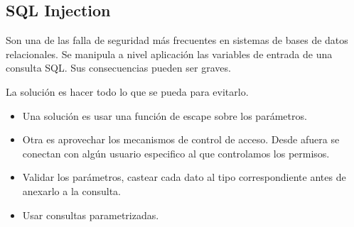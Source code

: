 \subsection*{SQL Injection}
Son una de las falla de seguridad más frecuentes en sistemas de bases de datos relacionales. Se manipula a nivel aplicación las variables de entrada de una consulta SQL. Sus consecuencias pueden ser graves.


\medskip
La solución es hacer todo lo que se pueda para evitarlo.

\begin{itemize}
\item Una solución es usar una función de escape sobre los parámetros.
\item Otra es aprovechar los mecanismos de control de acceso. Desde afuera se conectan con algún usuario especifico al que controlamos los permisos.
\item Validar los parámetros, castear cada dato al tipo correspondiente antes de anexarlo a la consulta.
\item Usar consultas parametrizadas.
\end{itemize}

\newpage